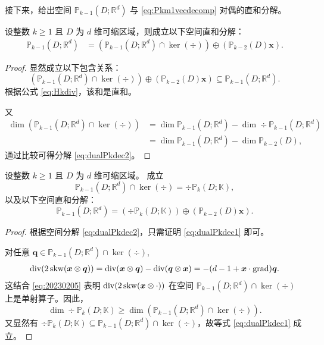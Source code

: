 接下来，给出空间 $\mathbb P_{k-1}(D; \mathbb R^d)$ 与 \eqref{eq:Pkm1vecdecomp} 对偶的直和分解。
\begin{lemma}\label{lem:dualPkdec}
设整数 $k \geq 1$ 且 $D$ 为 $d$ 维可缩区域，则成立以下空间直和分解：
\begin{align}
\mathbb P_{k-1}(D; \mathbb R^d) 
&= (\mathbb P_{k-1}(D; \mathbb R^d) \cap\ker(\div))\oplus (\mathbb P_{k-2}(D) \boldsymbol x). \label{eq:dualPkdec2}
\end{align}
\end{lemma}
\begin{proof}
显然成立以下包含关系：
$$
(\mathbb P_{k-1}(D; \mathbb R^d) \cap\ker(\div))\oplus (\mathbb P_{k-2}(D) \boldsymbol x)\subseteq \mathbb P_{k-1}(D; \mathbb R^d).
$$
根据公式 \eqref{eq:Hkdiv}，该和是直和。

又
\begin{align*}
\dim(\mathbb P_{k-1}(D; \mathbb R^d) \cap\ker(\div)) &= \dim\mathbb P_{k-1}(D; \mathbb R^d)-\dim\div\mathbb P_{k-1}(D; \mathbb R^d) \\
&= \dim\mathbb P_{k-1}(D; \mathbb R^d)-\dim\mathbb P_{k-2}(D),
\end{align*}
通过比较可得分解 \eqref{eq:dualPkdec2}。
\end{proof}

\begin{lemma}\label{lem:dualkerx}
设整数 $k \geq 1$ 且 $D$ 为 $d$ 维可缩区域。 成立
\begin{equation}  \label{eq:dualPkdec1}
\mathbb P_{k-1}(D; \mathbb R^d) \cap\ker(\div) = \div\mathbb P_{k}(D;\mathbb K),
\end{equation}
以及以下空间直和分解：
\begin{equation}\label{eq:dualPkm1vecdecomp}
\mathbb P_{k-1}(D; \mathbb R^d)= (\div\mathbb P_{k}(D;\mathbb K))\oplus (\mathbb P_{k-2}(D) \boldsymbol x).
\end{equation}
\end{lemma}

\begin{proof}
根据空间分解 \eqref{eq:dualPkdec2}，只需证明 \eqref{eq:dualPkdec1} 即可。

对任意 $\boldsymbol{q}\in \mathbb P_{k-1}(D; \mathbb R^d) \cap\ker(\div)$, 
\begin{align*}
\operatorname{div}(2\operatorname{skw}(\boldsymbol{x}\otimes\boldsymbol{q})) = \operatorname{div}(\boldsymbol{x}\otimes\boldsymbol{q}) - \operatorname{div}(\boldsymbol{q}\otimes\boldsymbol{x}) = - (d-1+\boldsymbol{x}\cdot\operatorname{grad})\boldsymbol{q}.
\end{align*}
这结合 \eqref{eq:20230205} 表明 $\operatorname{div}(2\operatorname{skw}(\boldsymbol{x}\otimes\cdot))$ 在空间 $\mathbb P_{k-1}(D; \mathbb R^d) \cap\ker(\div)$ 上是单射算子。因此，
$$
\dim\div\mathbb P_{k}(D;\mathbb K) \geq \dim(\mathbb P_{k-1}(D; \mathbb R^d) \cap\ker(\div)).
$$
又显然有 $\div\mathbb P_{k}(D;\mathbb K)\subseteq \mathbb P_{k-1}(D; \mathbb R^d) \cap\ker(\div)$，故等式 \eqref{eq:dualPkdec1} 成立。
\end{proof}

